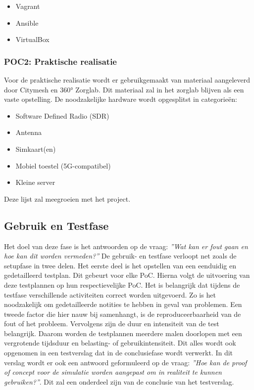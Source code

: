 \begin{itemize}
  \item Vagrant
  \item Ansible
  \item VirtualBox
\end{itemize}

\subsubsection{POC2: Praktische realisatie}

Voor de praktische realisatie wordt er gebruikgemaakt van materiaal aangeleverd door Citymesh en 360° Zorglab. Dit materiaal zal in het zorglab blijven als een vaste opstelling. De noodzakelijke hardware wordt opgesplitst in categorieën:

\begin{itemize}
  \item Software Defined Radio (SDR)
  \item Antenna
  \item Simkaart(en)
  \item Mobiel toestel (5G-compatibel)
  \item Kleine server
\end{itemize}

Deze lijst zal meegroeien met het project.

\subsection{Gebruik en Testfase}
Het doel van deze fase is het antwoorden op de vraag: \textit{''Wat kan er fout gaan en hoe kan dit worden vermeden?''} De gebruik- en testfase verloopt net zoals de setupfase in twee delen. Het eerste deel is het opstellen van een eenduidig en gedetailleerd testplan. Dit gebeurt voor elke PoC. Hierna volgt de uitvoering van deze testplannen op hun respectievelijke PoC. Het is belangrijk dat tijdens de testfase verschillende activiteiten correct worden uitgevoerd. Zo is het noodzakelijk om gedetailleerde notities te hebben in geval van problemen. Een tweede factor die hier nauw bij samenhangt, is de reproduceerbaarheid van de fout of het probleem. Vervolgens zijn de duur en intensiteit van de test belangrijk. Daarom worden de testplannen meerdere malen doorlopen met een vergrotende tijdsduur en belasting- of gebruikintensiteit. Dit alles wordt ook opgenomen in een testverslag dat in de conclusiefase wordt verwerkt. In dit verslag wordt er ook een antwoord geformuleerd op de vraag: \textit{''Hoe kan de proof of concept voor de simulatie worden aangepast om in realiteit te kunnen gebruiken?''}. Dit zal een onderdeel zijn van de conclusie van het testverslag.
